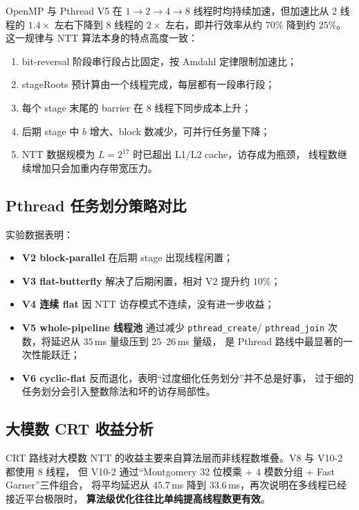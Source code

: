\documentclass[UTF8,a4paper,10pt]{ctexart}
\begin{document}
OpenMP 与 Pthread V5 在 $1 \to 2 \to 4 \to 8$ 线程时均持续加速，但加速比从 2 线程的
$1.4\times$ 左右下降到 8 线程的 $2\times$ 左右，即并行效率从约 $70\%$ 降到约 $25\%$。
这一规律与 NTT 算法本身的特点高度一致：

\begin{enumerate}
  \item bit-reversal 阶段串行段占比固定，按 Amdahl 定律限制加速比；
  \item stageRoots 预计算由一个线程完成，每层都有一段串行段；
  \item 每个 stage 末尾的 barrier 在 8 线程下同步成本上升；
  \item 后期 stage 中 $b$ 增大、block 数减少，可并行任务量下降；
  \item NTT 数据规模为 $L = 2^{17}$ 时已超出 L1/L2 cache，访存成为瓶颈，
        线程数继续增加只会加重内存带宽压力。
\end{enumerate}

\subsection{Pthread 任务划分策略对比}

实验数据表明：

\begin{itemize}
  \item \textbf{V2 block-parallel} 在后期 stage 出现线程闲置；
  \item \textbf{V3 flat-butterfly} 解决了后期闲置，相对 V2 提升约 $10\%$；
  \item \textbf{V4 连续 flat} 因 NTT 访存模式不连续，没有进一步收益；
  \item \textbf{V5 whole-pipeline 线程池} 通过减少 \texttt{pthread\_create}/
        \texttt{pthread\_join} 次数，将延迟从 $35$\,ms 量级压到 $25$--$26$\,ms 量级，
        是 Pthread 路线中最显著的一次性能跃迁；
  \item \textbf{V6 cyclic-flat} 反而退化，表明``过度细化任务划分''并不总是好事，
        过于细的任务划分会引入整数除法和坏的访存局部性。
\end{itemize}

\subsection{大模数 CRT 收益分析}

CRT 路线对大模数 NTT 的收益主要来自算法层而非线程数堆叠。V8 与 V10-2 都使用 8 线程，
但 V10-2 通过``Montgomery 32 位模乘 + 4 模数分组 + Fast Garner''三件组合，
将平均延迟从 $45.7$\,ms 降到 $33.6$\,ms，再次说明在多线程已经接近平台极限时，
\textbf{算法级优化往往比单纯提高线程数更有效}。
\end{document}
